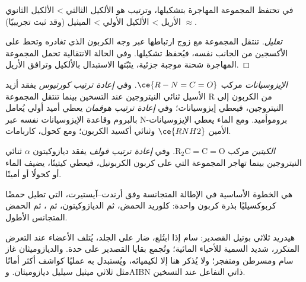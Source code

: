 \begin{proposition}\label{prop:b3:radicals-carbenes:bv-retention}
في  تحتفظ المجموعة المهاجرة
بتشكيلها، وترتيب  هو الألكيل الثالثي >
الألكيل الثانوي $\approx$ الأريل > الألكيل الأولي > الميثيل (وقد ثبت تجريبيًا).
\end{proposition}

\begin{proof}[تعليل]
تنتقل المجموعة مع زوج ارتباطها عبر وجه الكربون الذي تغادره
وتحط على الأكسجين من الجانب نفسه، فيُحفظ تشكيلها. وفي
الحالة الانتقالية تحمل المجموعة المهاجرة شحنة موجبة جزئية، يثبّتها
الاستبدال بالألكيل وترافق الأريل.
\end{proof}

\begin{definition}\label{def:b3:radicals-carbenes:curtius}
\emph{الإيزوسيانات} مركب $\ce{R-N=C=O}$. وفي \emph{إعادة ترتيب كورتيوس}
 يفقد أزيد الأسيل ثنائي النيتروجين عند
التسخين بينما تنتقل المجموعة R من الكربون إلى النيتروجين، فيعطي إيزوسيانات؛
وفي \emph{إعادة ترتيب هوفمان} يعطي أميد أولي
يُعامل بالبروم وقاعدة الإيزوسيانات نفسه عبر
N-بروموأميد. ومع الماء يعطي الإيزوسيانات الأمين $\ce{RNH2}$ وثنائي أكسيد
الكربون؛ ومع كحول، كاربامات.
\end{definition}

\begin{definition}\label{def:b3:radicals-carbenes:wolff}
\emph{الكيتين} مركب $\mathrm{R_2C{=}C{=}O}$. وفي \emph{إعادة ترتيب فولف}
 يفقد ديازوكيتون $\alpha$ ثنائي النيتروجين
بينما تهاجر المجموعة التي على كربون الكربونيل، فيعطي كيتينًا، يضيف
الماء أو كحولًا أو أمينًا.
\end{definition}

 هي الخطوة الأساسية في الإطالة المتجانسة وفق أرندت--آيستيرت،
التي تطيل حمضًا كربوكسيليًا بذرة كربون واحدة: كلوريد الحمض، ثم
الديازوكيتون، ثم ، ثم الحمض المتجانس الأطول.

\begin{safety}{}
هيدريد ثلاثي بوتيل القصدير: سام إذا ابتُلع، ضار على الجلد، يُتلف الأعضاء عند
التعرض المتكرر، شديد السمية للأحياء المائية؛ وتُجمع بقايا القصدير
على حدة. والديازوميثان غاز سام ومسرطن ومتفجر؛ ولا
يُذكر هنا إلا لكيميائه، ويُستبدل به عمليًا كواشف أكثر أمانًا
مثل ثلاثي ميثيل سيليل ديازوميثان. وAIBN ذاتي التفاعل عند التسخين.
\end{safety}

